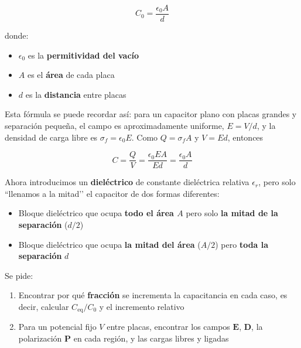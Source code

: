 \documentclass{article}
\begin{document}
\begin{equation}
C_{0} = \frac{\epsilon_{0}A}{d}
\label{eq:C0-capacitor}
\end{equation}

donde:
\begin{itemize}
  \item $\epsilon_{0}$ es la \textbf{permitividad del vacío}
  \item $A$ es el \textbf{área} de cada placa
  \item $d$ es la \textbf{distancia} entre placas
\end{itemize}

Esta fórmula se puede recordar así: para un capacitor plano con placas grandes y separación pequeña, el campo es aproximadamente uniforme, $E = V/d$, y la densidad de carga libre es $\sigma_{f} = \epsilon_{0}E$. Como $Q = \sigma_{f}A$ y $V = Ed$, entonces

\[
C = \frac{Q}{V} = \frac{\epsilon_{0}EA}{Ed} = \frac{\epsilon_{0}A}{d}
\]

Ahora introducimos un \textbf{dieléctrico} de constante dieléctrica relativa $\epsilon_{r}$, pero solo “llenamos a la mitad’’ el capacitor de dos formas diferentes:

\begin{itemize}
  \item[(a)] Bloque dieléctrico que ocupa \textbf{todo el área $A$} pero solo \textbf{la mitad de la separación} ($d/2$)
  \item[(b)] Bloque dieléctrico que ocupa \textbf{la mitad del área} ($A/2$) pero \textbf{toda la separación} $d$
\end{itemize}

Se pide:
\begin{enumerate}
  \item Encontrar por qué \textbf{fracción} se incrementa la capacitancia en cada caso, es decir, calcular $C_{\text{eq}}/C_{0}$ y el incremento relativo
  \item Para un potencial fijo $V$ entre placas, encontrar los campos $\mathbf{E}$, $\mathbf{D}$, la polarización $\mathbf{P}$ en cada región, y las cargas libres y ligadas
\end{enumerate}
\end{document}
